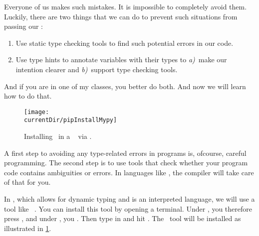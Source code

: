 Everyone of us makes such mistakes.
It is impossible to completely avoid them.
Luckily, there are two things that we can do to prevent such situations from passing our :%
%
\begin{enumerate}%
%
\item Use static type checking tools to find such potential errors in our code.%
%
\item Use type hints to annotate variables with their types to \emph{a)}~make our intention clearer and \emph{b)}~support type checking tools.%
%
\end{enumerate}%
%
And if you are in one of my classes, you better do both.
And now we will learn how to do that.%
\endhsection%
%
%
%
%
\begin{figure}%
\centering%
\texttt{[image: \\currentDir/pipInstallMypy]}%
\caption{Installing \mypy\ in a \ubuntu\  via \pip.}%
\label{fig:pipInstallMypy}%
\end{figure}%
%
%
%
%
%
A first step to avoiding any type-related errors in programs is, ofcourse, careful programming.
The second step is to use tools that check whether your program code contains ambiguities or errors.
In languages like , the compiler will take care of that for you.

In \python, which allows for dynamic typing and is an interpreted language, we will use a tool like \mypy~\cite{LLHSVRZSJYYMC2024MOSTFP}.
You can install this tool by opening a terminal.
Under \ubuntu, you therefore press \ubuntuTerminal, and under \windows, you \windowsTerminal.
Then type in  and hit \keys{\enter}.
The \mypy\ tool will be installed as illustrated in \cref{fig:pipInstallMypy}.

